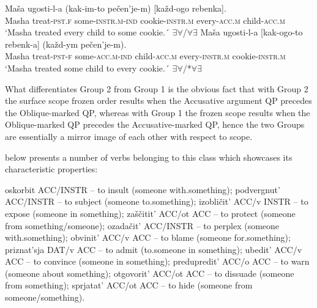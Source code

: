 \documentclass[output=paper,colorlinks,citecolor=brown,modfonts,nonflat]{langsci/langscibook}
\begin{document}
\ea%
    \label{ex:antonyuk:15}
    \ea \label{ex:antonyuk:15a}
    \gll    Maša ugosti-l-a (kak-im-to pečen’je-m) [každ-ogo rebenka].\\
            Masha treat\textsc{-pst.f} some\textsc{-instr.m-ind} cookie\textsc{-instr.m} every\textsc{-acc.m} child\textsc{-acc.m}\\
    \glt    `Masha treated every child to some cookie.´ 
            \hfill ${\exists}{\forall}$/${\forall}{\exists}$
    \ex \label{ex:antonyuk:15b}
    \gll    Maša ugosti-l-a [kak-ogo-to rebenk-a] (každ-ym pečen’je-m).\\
            Masha treat\textsc{-pst-f} \hspaceThis{[}some\textsc{-acc.m-ind} child\textsc{-acc.m} \hspaceThis{[}every\textsc{-instr.m} cookie\textsc{-instr.m}\\
    \glt    `Masha treated some child to every cookie.´ 
            \hfill ${\exists}{\forall}$/*${\forall}{\exists}$
    \z
\z

What differentiates Group 2 from Group 1 is the obvious fact that with Group 2 the surface scope frozen order results when the Accusative argument QP precedes the Oblique-marked QP, whereas with Group 1 the frozen scope results when the Oblique-marked QP precedes the Accusative-marked QP, hence the two Groups are essentially a mirror image of each other with respect to scope.

 below presents a number of verbs belonging to this class which showcases its characteristic properties:

\ea%
    \label{ex:antonyuk:16}
    \ea \label{ex:antonyuk:16a}
    oskorbit ACC/INSTR – to insult (someone with.something);
    \ex \label{ex:antonyuk:16b}
    podvergnut’ ACC/INSTR – to subject (someone to.something);
    \ex \label{ex:antonyuk:16c}
    izobličit’ ACC/v INSTR – to expose (someone in something);
    \ex \label{ex:antonyuk:16d}
    zaščitit’ ACC/ot ACC – to protect (someone from something/someone);
    \ex \label{ex:antonyuk:16e}
    ozadačit’ ACC/INSTR – to perplex (someone with.something);
    \ex \label{ex:antonyuk:16f}
    obvinit’ ACC/v ACC – to blame (someone for.something);
    \ex \label{ex:antonyuk:16g}
    priznat’sja DAT/v ACC – to admit (to.someone in something);
    \ex \label{ex:antonyuk:16h}
    ubedit’ ACC/v ACC – to convince (someone in something);
    \ex \label{ex:antonyuk:16i}
    predupredit’ ACC/o ACC – to warn (someone about something);
    \ex \label{ex:antonyuk:16j}
    otgovorit’ ACC/ot ACC – to dissuade (someone from something);
    \ex \label{ex:antonyuk:16k}
    sprjatat’ ACC/ot ACC – to hide (someone from someone/something).
    \z
\z
\end{document}
